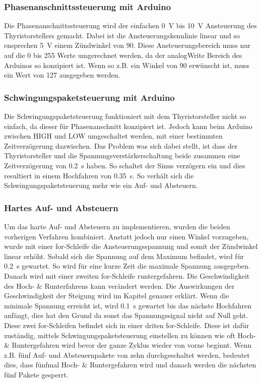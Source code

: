 \subsubsection{Phasenanschnittssteuerung mit Arduino}
Die Phasenanschnittssteuerung wird der einfachen \SI{0}{V} bis \SI{10}{V} Ansteuerung des Thyristorstellers gemacht. Dabei ist die Ansteuerungskennlinie linear und so ensprechen \SI{5}{V} einem Zündwinkel von 90\textdegree. Diese Ansteuerungsbereich muss nur auf die 0 bis 255 Werte umgerechnet werden, da der analogWrite Bereich des Arduinos so konzipiert ist. Wenn so z.B. ein Winkel von 90\textdegree \hspace{0.02cm} erwünscht ist, muss ein Wert von 127 ausgegeben werden.

\subsubsection{Schwingungspaketsteuerung mit Arduino}
Die Schwingungspaketsteuerung funktioniert mit dem Thyristorsteller nicht so einfach, da dieser für Phasenanschnitt konzipiert ist. Jedoch kann beim Arduino zwischen HIGH und LOW umgeschaltet werden, mit einer bestimmten Zeitverzögerung dazwischen. Das Problem was sich dabei stellt, ist dass der Thyristorsteller und die Spannungsverstärkerschaltung beide zusammen eine Zeitverzögerung von \SI{0.2}{s} haben. So schaltet der Sinus verzögern ein und dies resultiert in einem Hochfahren von \SI{0.35}{s}. So verhält sich die Schwingungspaketsteuerung mehr wie ein Auf- und Absteuern.

\subsubsection{Hartes Auf- und Absteuern}
Um das harte Auf- und Absteuern zu implementieren, wurden die beiden vorherigen Verfahren kombiniert. Anstatt jedoch nur einen Winkel vorzugeben, wurde mit einer for-Schleife die Ansteuerungsspannung und somit der Zündwinkel linear erhöht. Sobald sich die Spannung auf dem Maximum befindet, wird für \SI{0.2}{s} gewartet. So wird für eine kurze Zeit die maximale Spannung ausgegeben. Danach wird mit einer zweiten for-Schleife runtergefahren. Die Geschwindigkeit des Hoch- \& Runterfahrens kann verändert werden. Die Auswirkungen der Geschwindigkeit der Steigung wird im Kapitel  genauer erklärt. Wenn die minimale Spannung erreicht ist, wird \SI{0.1}{s} gewartet bis das nächste Hochfahren anfängt, dies hat den Grund da sonst das Spannungssignal nicht auf Null geht. Diese zwei for-Schleifen befindet sich in einer driten for-Schleife. Diese ist dafür zuständig, mittels Schwingungspaketsteuerung einstellen zu können wie oft Hoch- \& Runtergefahren wird bevor der ganze Zyklus wieder von vorne beginnt. Wenn z.B. fünf Auf- und Absteuernpakete von zehn durchgeschaltet werden, bedeutet dies, dass fünfmal Hoch- \& Runtergefahren wird und danach werden die nächsten fünf Pakete gesperrt.

